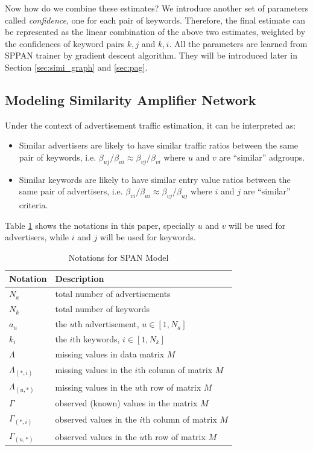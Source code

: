\documentclass[conference,compsoc]{IEEEtran}
\begin{document}
Now how do we combine these estimates? We introduce another set of parameters called {\em confidence}, one for each pair of keywords. Therefore, the final estimate can be represented as the linear combination of the above two estimates, weighted by the confidences of keyword pairs $k,j$ and $k,i$. All the parameters are learned from SPPAN trainer by gradient descent algorithm. They will be introduced later in Section \ref{sec:simi_graph} and \ref{sec:pag}.  



\subsection{Modeling Similarity Amplifier Network} 
\label{sec:model_san}

Under the context of advertisement traffic estimation, it can be interpreted as:
\begin{itemize}
  \item Similar advertisers are likely to have similar traffic ratios between the same pair of keywords,
    i.e. $\beta_{uj}/\beta_{ui} \approx \beta_{vj}/\beta_{vi}$ where
    $u$ and $v$ are ``similar'' adgroups.
  \item Similar keywords are likely to have similar entry value ratios between the same pair of advertisers,
    i.e. $\beta_{vi}/\beta_{ui} \approx \beta_{vj}/\beta_{uj}$ where
    $i$ and $j$ are ``similar'' criteria.
\end{itemize}

 Table \ref{tab:notations} shows the notations in this paper,  specially  $u$ and $v$ will be used for advertisers, while $i$ and $j$ will be used for keywords.

\begin{table}[!ht]
\centering
	\begin{tabular}{|l|l|}
	\hline
    Notation & Description \\ \hline
	$N_a$ & total number of advertisements \\ \hline
	$N_k$ & total number of keywords \\ \hline
	$a_u$ & the $u$th advertisement, $u\in [1,N_a]$\\ \hline
    $k_i$ & the $i$th keywords, $i\in [1,N_k]$\\ \hline
    $\Lambda$ & missing values in data matrix $M$\\ \hline
    $\Lambda_{(*,i)}$  & missing values in the $i$th column of matrix $M$\\ \hline
    $\Lambda_{(u,*)}$ & missing values in the $u$th row of matrix $M$\\ \hline
    $\Gamma$ & observed (known) values in the matrix $M$\\ \hline
    $\Gamma_{(*,i)}$ & observed values in the $i$th column of matrix $M$\\ \hline
    $\Gamma_{(u,*)}$& observed values in the $u$th row of matrix $M$\\     \hline
	\end{tabular}
	\caption{Notations for SPAN Model}
\label{tab:notations}
\end{table}
\end{document}
